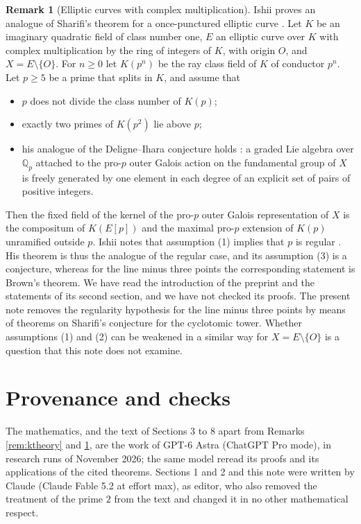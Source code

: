 \documentclass[11pt]{article}
\theoremstyle{definition}
\newtheorem{remark}[theorem]{Remark}
\numberwithin{equation}{section}
\begin{document}
\begin{remark}[Elliptic curves with complex multiplication]\label{rem:ishii}
Ishii proves an analogue of Sharifi's theorem for a once-punctured elliptic curve
\cite[Theorem~A, p.~2, which is Theorem~2.14, p.~11]{IshiiKernel2026}. Let $K$ be an imaginary quadratic field
of class number one, $E$ an elliptic curve over $K$ with complex multiplication by the ring of integers of $K$,
with origin $O$, and $X=E\setminus\{O\}$. For $n\ge0$ let $K(p^n)$ be the ray class field of $K$ of conductor
$p^n$. Let $p\ge5$ be a prime that splits in $K$, and assume that
\begin{itemize}
\item[\textup{(1)}] $p$ does not divide the class number of $K(p)$;
\item[\textup{(2)}] exactly two primes of $K(p^2)$ lie above $p$;
\item[\textup{(3)}] his analogue of the Deligne--Ihara conjecture holds
\cite[Conjecture~2.3, p.~6]{IshiiKernel2026}: a graded Lie algebra over $\mathbb Q_p$ attached to the pro-$p$
outer Galois action on the fundamental group of $X$ is freely generated by one element in each degree of an
explicit set of pairs of positive integers.
\end{itemize}
Then the fixed field of the kernel of the pro-$p$ outer Galois representation of $X$ is the compositum of
$K(E[p])$ and the maximal pro-$p$ extension of $K(p)$ unramified outside $p$. Ishii notes that assumption (1)
implies that $p$ is regular \cite[Remark~1.1.2\,(3), p.~3]{IshiiKernel2026}. His theorem is thus the analogue of
the regular case, and its assumption (3) is a conjecture, whereas for the line minus three points the
corresponding statement is Brown's theorem. We have read the introduction of the preprint and the statements of
its second section, and we have not checked its proofs. The present note removes the regularity hypothesis for
the line minus three points by means of theorems on Sharifi's conjecture for the cyclotomic tower. Whether
assumptions (1) and (2) can be weakened in a similar way for $X=E\setminus\{O\}$ is a question that this note
does not examine.
\end{remark}

\section*{Provenance and checks}

The mathematics, and the text of Sections 3 to 8 apart from Remarks \ref{rem:ktheory} and \ref{rem:ishii}, are
the work of GPT-6 Astra (ChatGPT Pro mode), in research runs of November 2026; the same model reread its proofs and its applications of the cited theorems. Sections 1
and 2 and this note were written by Claude (Claude Fable 5.2 at effort max), as editor, who also removed the
treatment of the prime $2$ from the text and changed it in no other mathematical respect.
\end{document}

